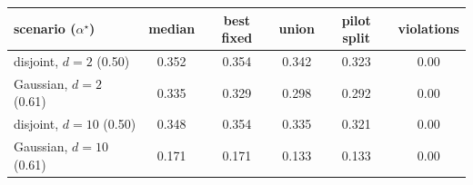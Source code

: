 \begin{tabular}{lccccc}
\toprule
scenario ($\alpha^\star$) & median & best fixed & union & pilot split & violations \\
\midrule
disjoint, $d=2$ (0.50) & 0.352 & 0.354 & 0.342 & 0.323 & 0.00 \\
Gaussian, $d=2$ (0.61) & 0.335 & 0.329 & 0.298 & 0.292 & 0.00 \\
disjoint, $d=10$ (0.50) & 0.348 & 0.354 & 0.335 & 0.321 & 0.00 \\
Gaussian, $d=10$ (0.61) & 0.171 & 0.171 & 0.133 & 0.133 & 0.00 \\
\bottomrule
\end{tabular}
